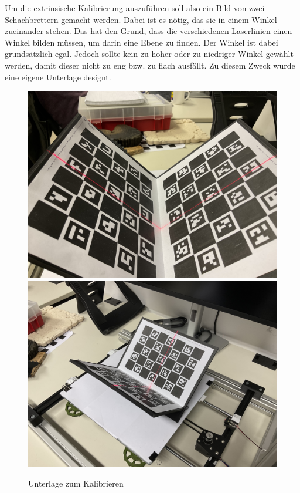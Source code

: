 		Um die extrinsische Kalibrierung auszuführen soll also ein Bild von zwei Schachbrettern gemacht werden. Dabei ist es nötig, das sie in einem Winkel zueinander stehen. Das hat den Grund, dass die verschiedenen Laserlinien einen Winkel bilden müssen, um darin eine Ebene zu finden. Der Winkel ist dabei grundsätzlich egal. Jedoch sollte kein zu hoher oder zu niedriger Winkel gewählt werden, damit dieser nicht zu eng bzw. zu flach ausfällt. Zu diesem Zweck wurde eine eigene Unterlage designt.
		
		\begin{figure}[h]
			\centering
			\includegraphics[width=0.49\linewidth]{img/hauptteil/ext-calib/pattern_0.jpg}
			\includegraphics[width=0.49\linewidth]{img/hauptteil/ext-calib/pattern_1.jpg}
			\caption{Unterlage zum Kalibrieren}
			\label{fig:ext-calib-pattern}
		\end{figure} 
	
